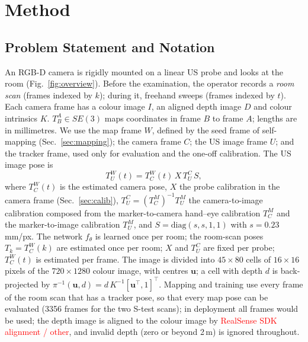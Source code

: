 \documentclass[9pt,shortpaper,twoside,web]{ieeecolor2}
\newcommand{\Stest}{S-test}
\begin{document}
\section{Method}
\label{sec:method}

\subsection{Problem Statement and Notation}
\label{sec:notation}
An RGB-D camera is rigidly mounted on a linear US probe and looks at the room (Fig.~\ref{fig:overview}). Before the examination, the operator records a \emph{room scan} (frames indexed by $k$); during it, freehand sweeps (frames indexed by $t$). Each camera frame has a colour image $I$, an aligned depth image $D$ and colour intrinsics $K$. $T^A_B\in SE(3)$ maps coordinates in frame $B$ to frame $A$; lengths are in millimetres. We use the map frame $W$, defined by the seed frame of self-mapping (Sec.~\ref{sec:mapping}); the camera frame $C$; the US image frame $U$; and the tracker frame, used only for evaluation and the one-off calibration. The US image pose is
\begin{equation}
  T^W_U(t)=T^W_C(t)\,X\,T^C_U\,S ,
  \label{eq:chain}
\end{equation}
where $T^W_C(t)$ is the estimated camera pose, $X$ the probe calibration in the camera frame (Sec.~\ref{sec:calib}), $T^C_U=(T^M_C)^{-1}T^M_U$ the camera-to-image calibration composed from the marker-to-camera hand--eye calibration $T^M_C$ and the marker-to-image calibration $T^M_U$, and $S=\mathrm{diag}(s,s,1,1)$ with $s=0.23$\,mm/px. The network $f_\theta$ is learned once per room; the room-scan poses $T_k=T^W_C(k)$ are estimated once per room; $X$ and $T^C_U$ are fixed per probe; $T^W_C(t)$ is estimated per frame. The image is divided into $45\times80$ cells of $16\times16$ pixels of the $720\times1280$ colour image, with centres $\mathbf{u}$; a cell with depth $d$ is back-projected by $\pi^{-1}(\mathbf{u},d)=d\,K^{-1}[\mathbf{u}^\top,1]^\top$. Mapping and training use every frame of the room scan that has a tracker pose, so that every map pose can be evaluated (3356 frames for the two \Stest{} scans); in deployment all frames would be used; the depth image is aligned to the colour image by \textcolor{red}{RealSense SDK alignment / other}, and invalid depth (zero or beyond 2\,m) is ignored throughout.
\end{document}
